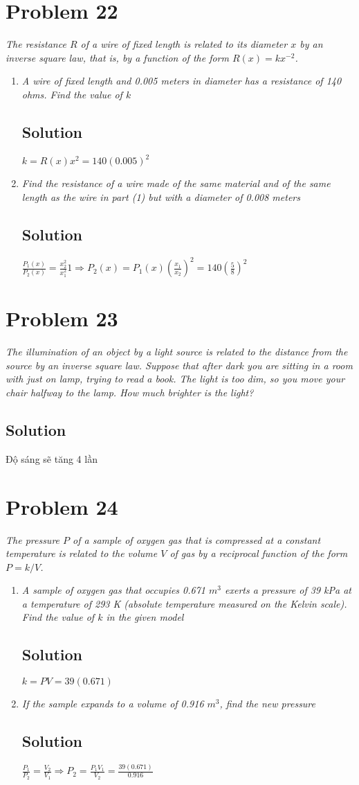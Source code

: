 \documentclass[11pt]{article}
\newcommand{\soln}{\subsection*}
\newcommand{\qn}{\textit}
\begin{document}
\section*{Problem 22}

\qn{The resistance $R$ of a wire of fixed length is related to its diameter $x$ by an inverse square law, that is, by a function of the form $R(x)=kx^{-2}$.}

\begin{enumerate}
	\item \qn{A wire of fixed length and 0.005 meters in diameter has a resistance of 140 ohms. Find the value of $k$}
	\soln{Solution}
	$k=R(x)x^2=140(0.005)^2$
	
	\item \qn{Find the resistance of a wire made of the same material and of the same length as the wire in part (1) but with a diameter of 0.008 meters}
	\soln{Solution}
	$\frac{P_1(x)}{P_2(x)}=\frac{x^2_2}{x^2_1}1 \Rightarrow P_2(x)=P_1(x)(\frac{x_1}{x_2})^2=140(\frac{5}{8})^2$
\end{enumerate}

\section*{Problem 23}

\qn{The illumination of an object by a light source is related to the distance from the source by an inverse square law. Suppose that after dark you are sitting in a room with just on lamp, trying to read a book. The light is too dim, so you move your chair halfway to the lamp. How much brighter is the light?}

\soln{Solution}
Độ sáng sẽ tăng 4 lần

\section*{Problem 24}

\qn{The pressure $P$ of a sample of oxygen gas that is compressed at a constant temperature is related to the volume $V$ of gas by a reciprocal function of the form $P=k/V$.}

\begin{enumerate}
	\item \qn{A sample of oxygen gas that occupies 0.671 $m^3$ exerts a pressure of 39 kPa at a temperature of 293 K (absolute temperature measured on the Kelvin scale). Find the value of $k$ in the given model}
	\soln{Solution}
	$k=PV=39(0.671)$
	
	\item \qn{If the sample expands to a volume of 0.916 $m^3$, find the new pressure}
	\soln{Solution}
	$\frac{P_1}{P_2}=\frac{V_2}{V_1} \Rightarrow P_2=\frac{P_1V_1}{V_2}=\frac{39(0.671)}{0.916}$
\end{enumerate}
\end{document}
